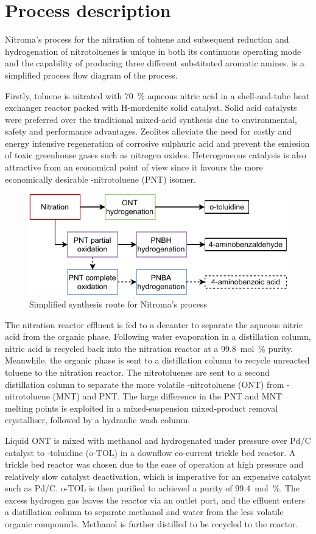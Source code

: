 \section*{Process description}

Nitroma's process for the nitration of toluene and subsequent reduction and hydrogenation of nitrotoluenes is unique in both its continuous operating mode and the capability of producing three different substituted aromatic amines.   is a simplified process flow diagram of the process.

Firstly, toluene is nitrated with \SI{70}{\percent} aqueous nitric acid in a shell-and-tube heat exchanger reactor packed with H-mordenite solid catalyst. Solid acid catalysts were preferred over the traditional mixed-acid synthesis due to environmental, safety and performance advantages. Zeolites alleviate the need for costly and energy intensive regeneration of corrosive sulphuric acid and prevent the emission of toxic greenhouse gases such as nitrogen oxides. Heterogeneous catalysis is also attractive from an economical point of view since it favours the more economically desirable \para-nitrotoluene (PNT) isomer. 

\begin{figure}
    \centering
    \includegraphics[width=0.4\linewidth]{chapters/0-executive-summary/figures/BFD_nitroma-simplifed.pdf}
    \caption{Simplified synthesis route for Nitroma's process}
    \label{fig:BFD-ES}
\end{figure}
The nitration reactor effluent is fed to a decanter to separate the aqueous nitric acid from the organic phase. Following water evaporation in a distillation column, nitric acid is recycled back into the nitration reactor at a \SI{99.8}{mol\percent} purity. Meanwhile, the organic phase is sent to a distillation column to recycle unreacted toluene to the nitration reactor. The nitrotoluenes are sent to a second distillation column to separate the more volatile \ortho-nitrotoluene (ONT) from \meta-nitrotoluene (MNT) and PNT. The large difference in the PNT and MNT melting points is exploited in a mixed-suspension mixed-product removal crystalliser, followed by a hydraulic wash column.

Liquid ONT is mixed with methanol and hydrogenated under pressure over Pd/C catalyst to \ortho-toluidine (o-TOL) in a downflow co-current trickle bed reactor. A trickle bed reactor was chosen due to the ease of operation at high pressure and relatively slow catalyst deactivation, which is imperative for an expensive catalyst such as Pd/C. o-TOL is then purified to achieved a purity of \SI{99.4}{mol\percent}. The excess hydrogen gas leaves the reactor via an outlet port, and the effluent enters a distillation column to separate methanol and water from the less volatile organic compounds. Methanol is further distilled to be recycled to the reactor. 


